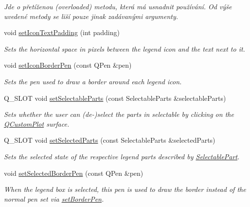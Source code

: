 \begin{DoxyCompactItemize}
\begin{DoxyCompactList}\small\item\em Jde o přetíženou (overloaded) metodu, která má usnadnit používání. Od výše uvedené metody se liší pouze jinak zadávanými argumenty. \end{DoxyCompactList}\item 
void \hyperlink{classQCPLegend_a62973bd69d5155e8ea3141366e8968f6}{set\+Icon\+Text\+Padding} (int padding)
\begin{DoxyCompactList}\small\item\em Sets the horizontal space in pixels between the legend icon and the text next to it. \end{DoxyCompactList}\item 
void \hyperlink{classQCPLegend_a2f2c93d18a651f4ff294bb3f026f49b8}{set\+Icon\+Border\+Pen} (const Q\+Pen \&pen)
\begin{DoxyCompactList}\small\item\em Sets the pen used to draw a border around each legend icon. \end{DoxyCompactList}\item 
Q\+\_\+\+S\+L\+O\+T void \hyperlink{classQCPLegend_a9ce60aa8bbd89f62ae4fa83ac6c60110}{set\+Selectable\+Parts} (const Selectable\+Parts \&selectable\+Parts)
\begin{DoxyCompactList}\small\item\em Sets whether the user can (de-\/)select the parts in {\itshape selectable} by clicking on the \hyperlink{classQCustomPlot}{Q\+Custom\+Plot} surface. \end{DoxyCompactList}\item 
Q\+\_\+\+S\+L\+O\+T void \hyperlink{classQCPLegend_a2aee309bb5c2a794b1987f3fc97f8ad8}{set\+Selected\+Parts} (const Selectable\+Parts \&selected\+Parts)
\begin{DoxyCompactList}\small\item\em Sets the selected state of the respective legend parts described by \hyperlink{classQCPLegend_a5404de8bc1e4a994ca4ae69e2c7072f1}{Selectable\+Part}. \end{DoxyCompactList}\item 
void \hyperlink{classQCPLegend_a2c35d262953a25d96b6112653fbefc88}{set\+Selected\+Border\+Pen} (const Q\+Pen \&pen)
\begin{DoxyCompactList}\small\item\em When the legend box is selected, this pen is used to draw the border instead of the normal pen set via \hyperlink{classQCPLegend_a866a9e3f5267de7430a6c7f26a61db9f}{set\+Border\+Pen}. \end{DoxyCompactList}\item 

\end{DoxyCompactItemize}
